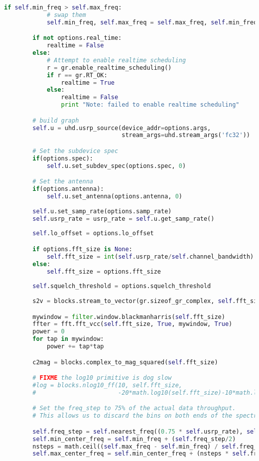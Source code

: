 \begin{lstlisting}[language=Python]
        if self.min_freq > self.max_freq:
            # swap them
            self.min_freq, self.max_freq = self.max_freq, self.min_freq

        if not options.real_time:
            realtime = False
        else:
            # Attempt to enable realtime scheduling
            r = gr.enable_realtime_scheduling()
            if r == gr.RT_OK:
                realtime = True
            else:
                realtime = False
                print "Note: failed to enable realtime scheduling"

        # build graph
        self.u = uhd.usrp_source(device_addr=options.args,
                                 stream_args=uhd.stream_args('fc32'))

        # Set the subdevice spec
        if(options.spec):
            self.u.set_subdev_spec(options.spec, 0)

        # Set the antenna
        if(options.antenna):
            self.u.set_antenna(options.antenna, 0)
        
        self.u.set_samp_rate(options.samp_rate)
        self.usrp_rate = usrp_rate = self.u.get_samp_rate()
        
        self.lo_offset = options.lo_offset

        if options.fft_size is None:
            self.fft_size = int(self.usrp_rate/self.channel_bandwidth)
        else:
            self.fft_size = options.fft_size
        
        self.squelch_threshold = options.squelch_threshold
        
        s2v = blocks.stream_to_vector(gr.sizeof_gr_complex, self.fft_size)

        mywindow = filter.window.blackmanharris(self.fft_size)
        ffter = fft.fft_vcc(self.fft_size, True, mywindow, True)
        power = 0
        for tap in mywindow:
            power += tap*tap

        c2mag = blocks.complex_to_mag_squared(self.fft_size)

        # FIXME the log10 primitive is dog slow
        #log = blocks.nlog10_ff(10, self.fft_size,
        #                       -20*math.log10(self.fft_size)-10*math.log10(power/self.fft_size))

        # Set the freq_step to 75% of the actual data throughput.
        # This allows us to discard the bins on both ends of the spectrum.

        self.freq_step = self.nearest_freq((0.75 * self.usrp_rate), self.channel_bandwidth)
        self.min_center_freq = self.min_freq + (self.freq_step/2) 
        nsteps = math.ceil((self.max_freq - self.min_freq) / self.freq_step)
        self.max_center_freq = self.min_center_freq + (nsteps * self.freq_step)


\end{lstlisting}
